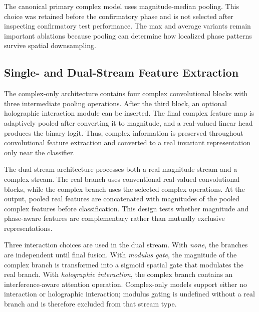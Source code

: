 \documentclass[journal]{IEEEtran}
\begin{document}
The canonical primary complex model uses magnitude-median pooling. This choice was retained before the confirmatory phase and is not selected after inspecting confirmatory test performance. The max and average variants remain important ablations because pooling can determine how localized phase patterns survive spatial downsampling.

\subsection{Single- and Dual-Stream Feature Extraction}
The complex-only architecture contains four complex convolutional blocks with three intermediate pooling operations. After the third block, an optional holographic interaction module can be inserted. The final complex feature map is adaptively pooled after converting it to magnitude, and a real-valued linear head produces the binary logit. Thus, complex information is preserved throughout convolutional feature extraction and converted to a real invariant representation only near the classifier.

The dual-stream architecture processes both a real magnitude stream and a complex stream. The real branch uses conventional real-valued convolutional blocks, while the complex branch uses the selected complex operations. At the output, pooled real features are concatenated with magnitudes of the pooled complex features before classification. This design tests whether magnitude and phase-aware features are complementary rather than mutually exclusive representations.

Three interaction choices are used in the dual stream. With \textit{none}, the branches are independent until final fusion. With \textit{modulus gate}, the magnitude of the complex branch is transformed into a sigmoid spatial gate that modulates the real branch. With \textit{holographic interaction}, the complex branch contains an interference-aware attention operation. Complex-only models support either no interaction or holographic interaction; modulus gating is undefined without a real branch and is therefore excluded from that stream type.
\end{document}
